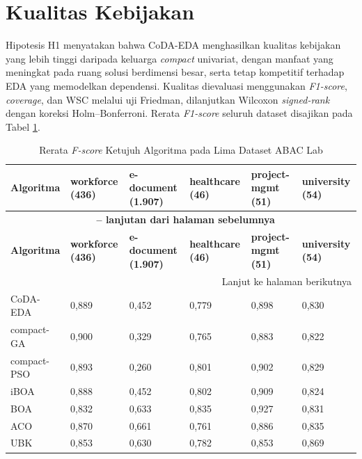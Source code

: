 \section{Kualitas Kebijakan}

Hipotesis H1 menyatakan bahwa CoDA-EDA menghasilkan kualitas kebijakan yang lebih tinggi daripada keluarga \textit{compact} univariat, dengan manfaat yang meningkat pada ruang solusi berdimensi besar, serta tetap kompetitif terhadap EDA yang memodelkan dependensi. 
Kualitas dievaluasi menggunakan \textit{F1-score}, \textit{coverage}, dan WSC melalui uji Friedman, dilanjutkan Wilcoxon \textit{signed-rank} dengan koreksi Holm–Bonferroni. 
Rerata \textit{F1-score} seluruh dataset disajikan pada Tabel \ref{tab:rerata-fscore}.

\begin{longtable}{|l|p{2cm}|p{2cm}|p{2cm}|p{2cm}|p{2cm}|}
\caption{Rerata \textit{F-score} Ketujuh Algoritma pada Lima Dataset ABAC Lab}
\label{tab:rerata-fscore} \\
\hline
\textbf{Algoritma} & \textbf{workforce (436)} & \textbf{e-document (1.907)} & \textbf{healthcare (46)} & \textbf{project-mgmt (51)} & \textbf{university (54)} \\
\hline
\endfirsthead

\multicolumn{6}{c}{{\bfseries \tablename\ \thetable{} -- lanjutan dari halaman sebelumnya}} \\
\hline
\textbf{Algoritma} & \textbf{workforce (436)} & \textbf{e-document (1.907)} & \textbf{healthcare (46)} & \textbf{project-mgmt (51)} & \textbf{university (54)} \\
\hline
\endhead

\hline
\multicolumn{6}{r}{Lanjut ke halaman berikutnya} \\
\endfoot

\hline
\endlastfoot

CoDA-EDA & 0{,}889 & 0{,}452 & 0{,}779 & 0{,}898 & 0{,}830 \\
\hline
compact-GA & 0{,}900 & 0{,}329 & 0{,}765 & 0{,}883 & 0{,}822 \\
\hline
compact-PSO & 0{,}893 & 0{,}260 & 0{,}801 & 0{,}902 & 0{,}829 \\
\hline
iBOA & 0{,}888 & 0{,}452 & 0{,}802 & 0{,}909 & 0{,}824 \\
\hline
BOA & 0{,}832 & 0{,}633 & 0{,}835 & 0{,}927 & 0{,}831 \\
\hline
ACO & 0{,}870 & 0{,}661 & 0{,}761 & 0{,}886 & 0{,}835 \\
\hline
UBK & 0{,}853 & 0{,}630 & 0{,}782 & 0{,}853 & 0{,}869 \\
\hline

\end{longtable}

